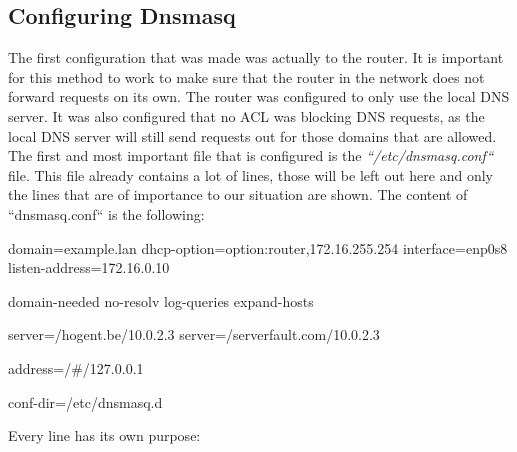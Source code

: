 \subsection{Configuring Dnsmasq}
The first configuration that was made was actually to the router. It is important for this method to work to make sure that the router in the network does not forward requests on its own. The router was configured to only use the local DNS server. It was also configured that no ACL was blocking DNS requests, as the local DNS server will still send requests out for those domains that are allowed.\\
The first and most important file that is configured is the \textit{``/etc/dnsmasq.conf``} file. This file already contains a lot of lines, those will be left out here and only the lines that are of importance to our situation are shown. The content of ``dnsmasq.conf`` is the following:
\begin{cisco}[title=dnsmasq.conf file]
domain=example.lan
dhcp-option=option:router,172.16.255.254
interface=enp0s8
listen-address=172.16.0.10

domain-needed
no-resolv
log-queries
expand-hosts

server=/hogent.be/10.0.2.3
server=/serverfault.com/10.0.2.3

address=/#/127.0.0.1

conf-dir=/etc/dnsmasq.d
\end{cisco}
Every line has its own purpose:
